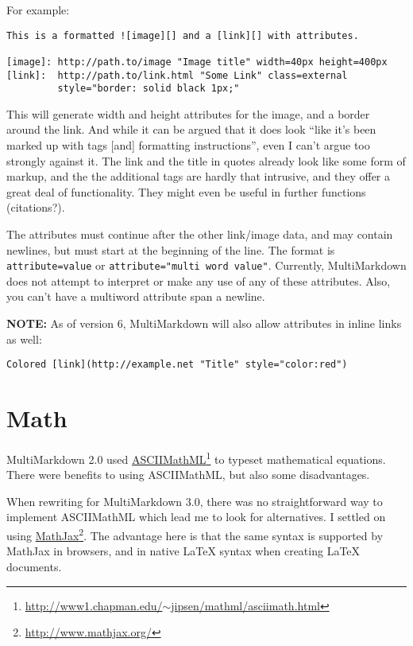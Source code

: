For example:

\begin{verbatim}
This is a formatted ![image][] and a [link][] with attributes.

[image]: http://path.to/image "Image title" width=40px height=400px
[link]:  http://path.to/link.html "Some Link" class=external
         style="border: solid black 1px;"
\end{verbatim}

This will generate width and height attributes for the image, and a border
around the link. And while it can be argued that it does look ``like it's been
marked up with tags {[and]} formatting instructions'', even I can't argue too
strongly against it. The link and the title in quotes already look like some
form of markup, and the the additional tags are hardly that intrusive, and
they offer a great deal of functionality. They might even be useful in further
functions (citations?).

The attributes must continue after the other link\slash{}image data, and may contain
newlines, but must start at the beginning of the line. The format is
\texttt{attribute=value} or \texttt{attribute="multi word value"}. Currently, MultiMarkdown
does not attempt to interpret or make any use of any of these attributes.
Also, you can't have a multiword attribute span a newline.

\textbf{NOTE:} As of version 6, MultiMarkdown will also allow attributes in inline links as well:

\begin{verbatim}
Colored [link](http://example.net "Title" style="color:red")
\end{verbatim}

\section{Math}
\label{math}

MultiMarkdown 2.0 used \href{http://www1.chapman.edu/~jipsen/mathml/asciimath.html}{ASCIIMathML}\footnote{\href{http://www1.chapman.edu/~jipsen/mathml/asciimath.html}{http:\slash{}\slash{}www1.chapman.edu\slash{}\ensuremath{\sim}jipsen\slash{}mathml\slash{}asciimath.html}} to typeset mathematical equations. There
were benefits to using ASCIIMathML, but also some disadvantages.

When rewriting for MultiMarkdown 3.0, there was no straightforward way to
implement ASCIIMathML which lead me to look for alternatives. I settled on
using \href{http://www.mathjax.org/}{MathJax}\footnote{\href{http://www.mathjax.org/}{http:\slash{}\slash{}www.mathjax.org\slash{}}}. The advantage here is that the same syntax is supported by
MathJax in browsers, and in native LaTeX syntax when creating LaTeX documents.


